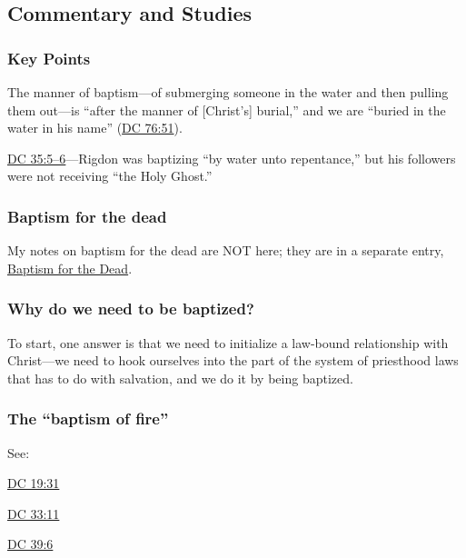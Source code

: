 	
	
\subsection{Commentary and Studies} %
	\label{BAPTISM-COMMENTARY}

	\subsubsection{Key Points}
		\label{BAPTISM-KEYS}
	
		\begin{compactitem}
			\item The manner of baptism---of submerging someone in the water and then pulling them out---is ``after the manner of [Christ's] burial,'' and we are ``buried in the water in his name'' (\hyperref[DC76-51]{DC 76:51}).
			\item \hyperref[DC35-5]{DC 35:5--6}---Rigdon was baptizing ``by water unto repentance,'' but his followers were not receiving ``the Holy Ghost.''
		\end{compactitem}
		
	\subsubsection{Baptism for the dead}
	
		My notes on baptism for the dead are NOT here; they are in a separate entry, \hyperref[BAPTISMDEAD]{Baptism for the Dead}.
		
	\subsubsection{Why do we need to be baptized?}
		\label{BAPTISM-necessity}
		
		To start, one answer is that we need to initialize a law-bound relationship with Christ---we need to hook ourselves into the part of the system of priesthood laws that has to do with salvation, and we do it by being baptized.
		
	\subsubsection{The ``baptism of fire''}
		\label{BAPTISM-fire}
		
		See:
		
			\begin{compactitem}
				\item \hyperref[DC19-31]{DC 19:31}
				\item \hyperref[DC33-11]{DC 33:11}
				\item \hyperref[DC39-6]{DC 39:6}
			\end{compactitem}